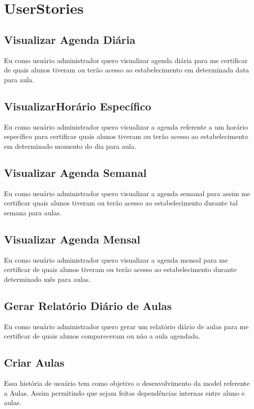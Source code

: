 \section[UserStories]{UserStories}
\subsection[Visualizar Agenda Diária]{Visualizar Agenda Diária}
Eu como usuário administrador quero visualizar agenda diária para
me certificar de quais alunos tiveram ou terão acesso ao estabelecimento
em determinada data para aula.

\subsection[Visualizar Horário Específico]{VisualizarHorário Específico}
Eu como usuário administrador quero visualizar a agenda referente a um horário
específico para certificar quais alunos tiveram ou terão acesso ao
estabelecimento em determinado momento do dia para aula.

\subsection[Visualizar Agenda Semanal]{Visualizar Agenda Semanal}
Eu como usuário administrador quero visualizar a agenda semanal para assim me
certificar quais alunos tiveram ou terão acesso ao estabelecimento durante tal
semana para aulas.

\subsection[Visualizar Agenda Mensal]{Visualizar Agenda Mensal}
Eu como usuário administrador quero visualizar a agenda mensal para me
certificar de quais alunos tiveram ou terão acesso ao estabelecimento durante
determinado mês para aulas.

\subsection[Gerar Relatório Diário de Aulas]{Gerar Relatório Diário de Aulas}
Eu como usuário administrador quero gerar um relatório diário de aulas para me
certificar de quais alunos compareceram ou não a aula agendada.

\subsection[Criar Aulas]{Criar Aulas}
Essa história de usuário tem como objetivo o desenvolvimento da model referente
a Aulas. Assim permitindo que sejam feitas dependências internas entre aluno
e aulas.


